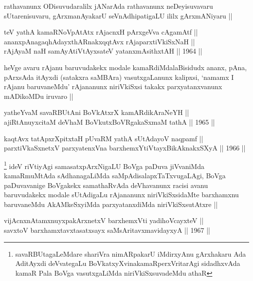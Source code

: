 \begin{artha}
rathavanunx ODisuvudaralilx jANarAda rathavanunx neDeyisuvavaru
sUtarenisuvaru, gArxmanAyakarU seVnAdhipatigaLU ililx gArxmANiyaru ||
\end{artha}

\begin{shl}
teV yathA kamaRNoVpAtAtx rAjacnxH pArxgeVva cA\s \s gamAtf || \\
ananxpAnagaqhAdayxthARnakxqqtAvx rAjaparxtiVkiSxNaH || \\
rAjA\s yaM naH samAyAtiVtAyxsateV yatanxmAsithxtAH ||  1964 || 
\end{shl} 

\begin{artha}
heVge avaru rAjanu baruvudakekx modale kamaRdiMdalaBisidudx ananx, pAna,
pArxsAda itAyxdi (satakxra saMBAra) vasutxgaLanunx kalipxsi, `namamx I
rAjanu baruvaneMdu' rAjananunx niriVkiSxsi takakx parxyatanxvanunx
mADikoMDu iruvaro ||
\end{artha}


\begin{shl}
yatheYvaM savaRBUtAni BoVkAtxrX kamARdikAraNeYH || \\
ajiRtAnuyxcitaM deVhaM BoVkutxBoVRgakaSxmaM tathA ||  1965 ||  
\end{shl}

\begin{shl}
kaqtAvx tatApxrXpitxtaH pUvaRM yathA sUtAdayoV naqpamf || \\
parxtiVkaSxnetxV parxyatenxVna barxhemxYtiVtayxBikAknakxSXyA ||  1966 ||  
\end{shl}

\begin{artha}
\footnote[1]{savaRBUtagaLeMdare shariVra nimARpakarU iMdirxyAnu
  gArxhakaru Ada AditAyxdi deVvategaLu BoVkatxyXvinakamaRperxVritarAgi
sidadhxvAda kamaR Pala BoVga vasutxgaLiMda  niriVkiSxsuvadeMdu athaR}
ideV riVtiyAgi samasatxpArxNigaLU BoVga paDuva jiVvaniMda kamaRmuMtAda
sAdhanagaLiMda saMpAdisalapxTaTxvugaLAgi, BoVga paDuvavanige BoVgakekx
samathaRvAda deVhavanunx racisi avanu baruvudakekx modale sUtAdigaLu
rAjananunx niriVkiSxsidaMte barxhamxnu baruvaneMdu AkAMkeSxyiMda
parxyatanxdiMda niriVkiSxsutAtxre ||
\end{artha}


\begin{shl}
vijAcnxnAtamxnuyxpakArxnetxV barxhemxVti yadihoVcayxteV || \\
savxtoV barxhamxtavxtasatxsayx saMsAritavxmavidayxyA ||  1967 ||  
\end{shl}

